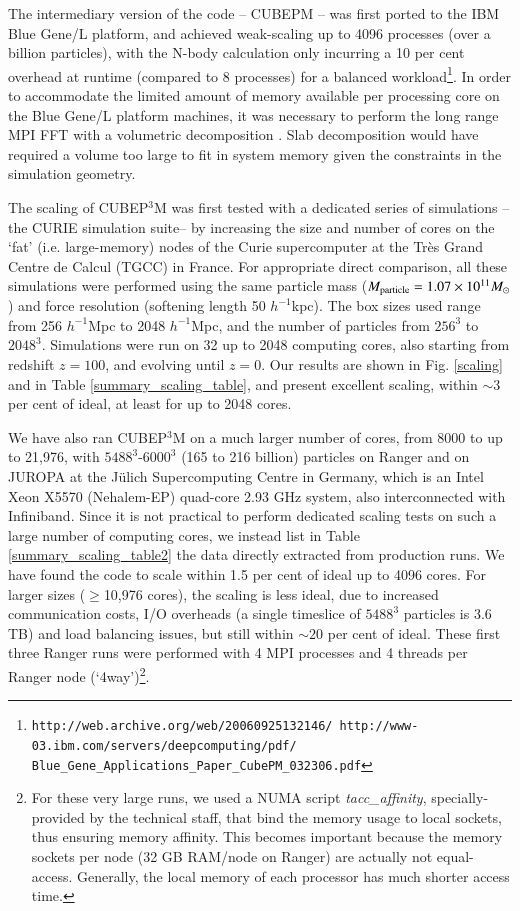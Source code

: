 \documentclass[useAMS,usenatbib]{mn2e}
\begin{document}
 The intermediary version of the code -- {\small CUBEPM} --
was first  ported to the IBM Blue Gene/L platform, and achieved 
weak-scaling up to 4096 processes (over a billion particles), with the N-body calculation only incurring a 10 per cent overhead 
at runtime (compared to 8 processes) for a balanced workload\footnote{\tt http://web.archive.org/web/20060925132146/ http://www-03.ibm.com/servers/deepcomputing/pdf/ Blue\_Gene\_Applications\_Paper\_CubePM\_032306.pdf}.  In order to 
accommodate the limited amount of memory available per processing core on the 
Blue Gene/L platform machines, it was necessary to perform the long range {\small MPI FFT}
with a volumetric decomposition \citep{3DFFT}.
Slab decomposition would have required a volume too large to fit in system 
memory given the constraints in the simulation geometry. 

 
The scaling of {\small CUBEP$^3$M}  was first  tested with a dedicated series 
of simulations -- the CURIE simulation suite-- by increasing the size and number of cores on the `fat' 
(i.e. large-memory) nodes of the  Curie supercomputer at the Tr\`{e}s Grand Centre de Calcul (TGCC) in France. 
 For appropriate direct comparison,
all these simulations were performed using the same particle mass 
($M_{\rm particle}=1.07\times10^{11}M_\odot$) and force resolution 
(softening length 50 $h^{-1}$kpc). The box sizes used range from 256 $h^{-1}$Mpc
to 2048 $h^{-1}$Mpc, and the number of particles from $256^3$ to $2048^3$.
Simulations were run on 32 up to 2048 computing cores, also starting from 
redshift $z=100$, and evolving until $z=0$. Our results are shown in Fig. \ref{scaling} and in Table \ref{summary_scaling_table}, and present excellent scaling, within 
$\sim3$ per cent of ideal, at least for up to 2048 cores. 



We have also ran {\small CUBEP$^3$M} on a much larger number of cores, 
from 8000 to up to 21,976, with $5488^3$-$6000^3$ (165 to 216 billion) 
particles on Ranger and on JUROPA at the J\"ulich Supercomputing Centre in Germany, 
which is an Intel Xeon X5570 
(Nehalem-EP) quad-core 2.93 GHz system, also interconnected with Infiniband.
Since it is not practical to perform dedicated scaling tests on such a large number of
computing cores, we instead list in Table \ref{summary_scaling_table2} 
the data directly extracted from production runs. We have found the 
code to scale within 1.5 per cent of ideal up to 4096 cores. 
For larger sizes ($\ge$10,976 cores), the scaling is less ideal,
due to increased communication 
costs, I/O overheads (a single timeslice of $5488^3$ particles is 3.6 TB)
and load balancing issues, but still within $\sim20$ per cent of ideal. 
These first three Ranger runs were performed 
with 4 {\small MPI} processes and 4 threads per Ranger node (`4way')\footnote{For these very large runs, 
we used a NUMA script {\it tacc\_affinity}, specially-provided by the technical staff, 
that bind the memory usage to local sockets, thus ensuring memory affinity. 
This becomes important because the memory sockets per node 
(32 GB RAM/node on Ranger) are actually not equal-access. Generally, the local 
memory of each processor has much shorter access time.}.
\end{document}
